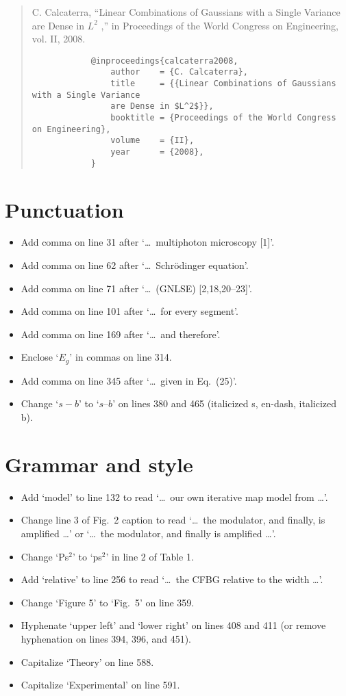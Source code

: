 \documentclass[11pt,a4paper]{article}
\begin{document}
\begin{enumerate}
\begin{quote}
		C. Calcaterra, “Linear Combinations of Gaussians with a Single Variance are Dense in $L^2$ ,” in Proceedings of the World Congress on Engineering, vol. II, 2008.

		\begin{verbatim}
			@inproceedings{calcaterra2008,
				author    = {C. Calcaterra},
				title     = {{Linear Combinations of Gaussians with a Single Variance
				are Dense in $L^2$}},
				booktitle = {Proceedings of the World Congress on Engineering},
				volume    = {II},
				year      = {2008},
			}
		\end{verbatim}
	\end{quote}
\end{enumerate}




\section{Punctuation}
\begin{itemize}
	\item Add comma on line 31 after `\ldots\ multiphoton microscopy [1]'.
	\item Add comma on line 62 after `\ldots\ Schr\"odinger equation'.
	\item Add comma on line 71 after `\ldots\ (GNLSE) [2,18,20--23]'.
	\item Add comma on line 101 after `\ldots\ for every segment'.
	\item Add comma on line 169 after `\ldots\ and therefore'.
	\item Enclose `$E_g$' in commas on line 314.
	\item Add comma on line 345 after `\ldots\ given in Eq.~(25)'.
	\item Change `$s - b$' to `$s$--$b$' on lines 380 and 465 (italicized s, en-dash, italicized b).
\end{itemize}

\section{Grammar and style}
\begin{itemize}
	\item Add `model' to line 132 to read `\ldots\ our own iterative map model from \ldots'.
	\item Change line 3 of Fig.~2 caption to read `\ldots\ the modulator, and finally, is amplified \ldots' or `\ldots\ the modulator, and finally is amplified \ldots'.
	\item Change `Ps$^2$' to `ps$^2$' in line 2 of Table 1.
	\item Add `relative' to line 256 to read `\ldots\ the CFBG relative to the width \ldots'.
	\item Change `Figure 5' to `Fig.~5' on line 359.
	\item Hyphenate `upper left' and `lower right' on lines 408 and 411 (or remove hyphenation on lines 394, 396, and 451).
	\item Capitalize `Theory' on line 588.
	\item Capitalize `Experimental' on line 591.
\end{itemize}
\end{document}
